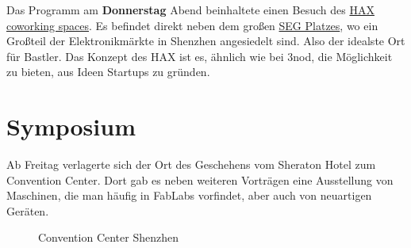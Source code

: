 \documentclass{\basedir/fablab-document}
\begin{document}
Das Programm am \textbf{Donnerstag} Abend beinhaltete einen Besuch des
\href{https://hax.co/about/}{HAX coworking spaces}. Es befindet direkt neben
dem großen \href{https://en.wikipedia.org/wiki/SEG_Plaza}{SEG Platzes},
wo ein Großteil der Elektronikmärkte in Shenzhen angesiedelt sind. Also
der idealste Ort für Bastler. Das Konzept des HAX ist es, ähnlich wie
bei 3nod, die Möglichkeit zu bieten, aus Ideen Startups zu gründen.

\section*{Symposium}

Ab Freitag verlagerte sich der Ort des Geschehens vom Sheraton Hotel zum
Convention Center. Dort gab es neben weiteren Vorträgen eine Ausstellung
von Maschinen, die man häufig in FabLabs vorfindet, aber auch von
neuartigen Geräten.

\begin{figure}[h]
	\noindent{}
	\caption{Convention Center Shenzhen}
	\label{convention_center}
\end{figure}
\end{document}
